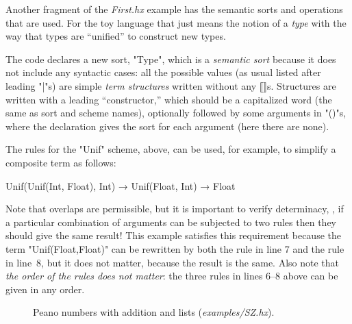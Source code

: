 \documentclass[11pt]{article} %
\begin{document}
\begin{example}\label{ex:unif}
  Another fragment of the \emph{First.hx} example has the semantic sorts and operations that are
  used. For the toy language that just means the notion of a \emph{type} with the way that types are
  ``unified'' to construct new types.
  The code declares a new sort, "Type", which is a \emph{semantic sort} because it does not include
  any syntactic cases: all the possible values (as usual listed after leading "|"s) are simple
  \emph{term structures} written without any ⟦⟧s.  Structures are written with a leading
  ``constructor,'' which should be a capitalized word (the same as sort and scheme names),
  optionally followed by some arguments in "()"s, where the declaration gives the sort for each
  argument (here there are none).

  The rules for the "Unif" scheme, above, can be used, for example, to simplify a composite term as
  follows:
  \begin{hacs}[xleftmargin=\parindent,xrightmargin=\parindent]
Unif(Unif(Int, Float), Int) → Unif(Float, Int) → Float
  \end{hacs}
  Note that overlaps are permissible, but it is important to verify determinacy, \ie, if a
  particular combination of arguments can be subjected to two rules then they should give the same
  result! This example satisfies this requirement because the term "Unif(Float,Float)" can be
  rewritten by both the rule in line 7 and the rule in line~8, but it does not matter, because the
  result is the same. Also note that \emph{the order of the rules does not matter}: the three rules
  in lines 6--8 above can be given in any order.
\end{example}

\begin{figure}[p]
  \caption{Peano numbers with addition and lists (\emph{examples/SZ.hx}).}
  \label{fig:sz}
\end{figure}
\end{document}
